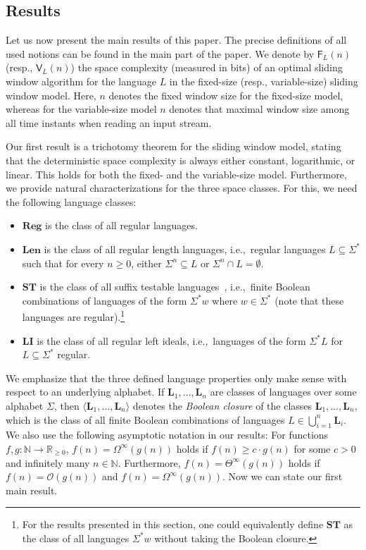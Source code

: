 \documentclass{theoretics}
\newcommand{\N}{\mathbb{N}}
\renewcommand{\O}{\mathcal{O}}
\newcommand{\F}{\mathsf{F}}
\newcommand{\V}{\mathsf{V}}
\newcommand{\Reg}{\mathbf{Reg}}
\newcommand{\Len}{\mathbf{Len}}
\newcommand{\LI}{\mathbf{LI}}
\newcommand{\ST}{\mathbf{ST}}
\renewcommand{\geq}{\geqslant}
\renewcommand{\ge}{\geq}
\newcommand{\Omegainf}{\Omega^{\scriptscriptstyle{\infty}}}
\newcommand{\Thetainf}{\Theta^{\scriptscriptstyle{\infty}}}
\begin{document}
\subsection{Results} \label{sec-results}

Let us now present the main results of this paper.
The precise definitions of all used notions can be found in the main part of the paper.
We denote by $\F_L(n)$ (resp., $\V_L(n)$) the space complexity (measured in bits) of an optimal sliding window algorithm
for the language $L$ in the fixed-size (resp., variable-size) sliding window model.
Here, $n$ denotes the fixed window size for the fixed-size model, whereas for 
the variable-size model $n$ denotes that maximal window
size among all time instants when reading an input stream.

Our first result is a trichotomy theorem for the sliding window model,
stating that the deterministic space complexity is always
either constant, logarithmic, or linear.
This holds for both the fixed- and the variable-size model.
Furthermore, we provide natural characterizations for the three space classes. For this, we need
the following language classes:
\begin{itemize}
\item $\Reg$ is the class of all regular languages.
\item $\Len$ is the class of all regular length languages, i.e.,~regular languages $L\subseteq \Sigma^*$
such that for every $n \geq 0$, either $\Sigma^n \subseteq L$ or $\Sigma^n \cap L = \emptyset$.
\item $\ST$ is the class of all suffix testable languages~\cite[Section~5.3]{Pin97}, i.e.,~finite Boolean combinations of languages of the form $\Sigma^* w$ where $w \in \Sigma^*$
(note that these languages are regular).\footnote{For the results presented in this section, one could equivalently define $\ST$ as the class of all languages $\Sigma^* w$ without taking the Boolean closure.}
\item $\LI$ is the class of all regular left ideals, i.e.,~languages of the form $\Sigma^* L$ for $L\subseteq \Sigma^*$
regular.
\end{itemize}
We emphasize that the three defined language properties
only make sense with respect to an underlying alphabet.
If $\mathbf{L}_1, \dots, \mathbf{L}_n$ are classes of languages over some alphabet $\Sigma$,
then $\langle \mathbf{L}_1, \dots, \mathbf{L}_n \rangle$
denotes the {\em Boolean closure} of the classes $\mathbf{L}_1, \dots, \mathbf{L}_n$, which is
the class of all finite Boolean combinations of languages $L \in \bigcup_{i=1}^n\mathbf{L}_i$.
We also use the following asymptotic notation in our results:
For functions $f,g \colon \N \to \mathbb{R}_{\ge 0}$,
$f(n) = \Omegainf(g(n))$ holds if $f(n) \ge c \cdot g(n)$ for some $c > 0$ and
infinitely many $n \in \N$.
Furthermore, $f(n) = \Thetainf(g(n))$ holds if $f(n) = \O(g(n))$
and $f(n) = \Omegainf(g(n))$. Now we can state our first main result.
\end{document}
